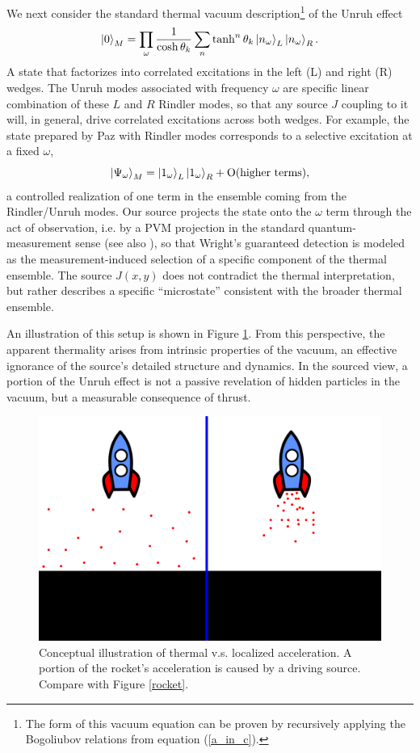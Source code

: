 \documentclass[12pt,a4paper]{article}
\begin{document}
{We next consider the standard thermal vacuum description\footnote{The form of this vacuum equation can be proven by recursively applying the Bogoliubov relations from equation (\ref{a_in_c}).} of the Unruh effect
\begin{equation}
  \ket{0}_M = \prod_{\omega} \frac{1}{\cosh{\theta_k}} \sum_n \tanh^n{\theta_k} \ket{n_\omega}_{L} \ket{n_\omega}_{R}.
  \label{vacuum}
\end{equation}
A state that factorizes into correlated excitations in the left (L) and right (R) wedges. The Unruh modes associated with frequency $\omega$ are specific linear combination of these $L$ and $R$ Rindler modes, so that any source $J$ coupling to it will, in general, drive correlated excitations across both wedges. For example, the state prepared by Paz with Rindler modes corresponds to a selective excitation at a fixed $\omega$,
\begin{equation}
  \ket{\Psi_\omega}_M = \ket{1_\omega}_L \ket{1_\omega}_R + \text{O(higher terms)},
  \label{one_fock}
\end{equation}
a controlled realization of one term in the ensemble coming from the Rindler/Unruh modes. Our source projects the state onto the $\omega$ term through the act of observation, i.e. by a PVM projection in the standard quantum-measurement sense (see also \cite{han2008generating}), so that Wright’s guaranteed detection is modeled as the measurement-induced selection of a specific component of the thermal ensemble. The source $J(x,y)$ does not contradict the thermal interpretation, but rather describes a specific ``microstate'' consistent with the broader thermal ensemble.

An illustration of this setup is shown in Figure \ref{rocket_inertial}. From this perspective, the apparent thermality arises from intrinsic properties of the vacuum, an effective ignorance of the source's detailed structure and dynamics. In the sourced view, a portion of the Unruh effect is not a passive revelation of hidden particles in the vacuum, but a measurable consequence of thrust.


\begin{figure}[h]
\centering
\includegraphics[scale=0.5]{rocket_inertial.png}
\caption{Conceptual illustration of thermal v.s. localized acceleration. A portion of the rocket's acceleration is caused by a driving source. Compare with Figure \ref{rocket}.}
\label{rocket_inertial}
\end{figure}

}
\end{document}
